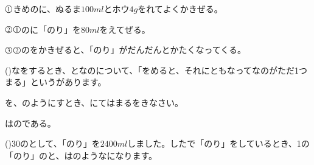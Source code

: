 \documentclass[
  12pt,a4paper,lualatex,ja=standard]{bxjsarticle}
\begin{document}
\begin{flushleft}
\begin{framed}
$\raise 0.2ex\hbox{\textcircled{\scriptsize{1}}}$\hspace{1em}きめのに、ぬるま$100\si{ml}$とホウ$4\si{g}$をれてよくかきぜる。

$\raise 0.2ex\hbox{\textcircled{\scriptsize{2}}}$\hspace{1em}$\raise 0.2ex\hbox{\textcircled{\scriptsize{1}}}$のに「のり」を$80\si{ml}$をえてぜる。

$\raise 0.2ex\hbox{\textcircled{\scriptsize{3}}}$\hspace{1em}$\raise 0.2ex\hbox{\textcircled{\scriptsize{2}}}$のをかきぜると、「のり」がだんだんとかたくなってくる。
\end{framed}

()\hspace{2.5pt}なをするとき、となのについて、「をめると、それにともなってなのがただ1つまる」というがあります。

\hspace*{2em}を、のようにすとき、\fbox{\phantom{あああ}}にてはまるをきなさい。

\begin{center}
\fbox{\phantom{材料の量}}は\fbox{\phantom{参加人数}}のである。
\end{center}

\vfill

()\hspace{2.5pt}30のとして、「のり」を$2400\si{ml}$しました。したで「のり」をしているとき、1の「のり」のと、はのようなになります。


\end{flushleft}
\end{document}

